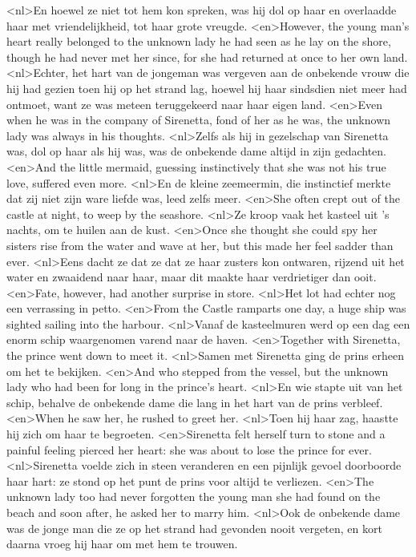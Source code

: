 <nl>En hoewel ze niet tot hem kon spreken, was hij dol op haar en overlaadde haar met vriendelijkheid, tot haar grote vreugde.
<en>However, the young man’s heart really belonged to the unknown lady he had seen as he lay on the shore, though he had never met her since, for she had returned at once to her own land.
<nl>Echter, het hart van de jongeman was vergeven aan de onbekende vrouw die hij had gezien toen hij op het strand lag, hoewel hij haar sindsdien niet meer had ontmoet, want ze was meteen teruggekeerd naar haar eigen land.
<en>Even when he was in the company of Sirenetta, fond of her as he was, the unknown lady was always in his thoughts.
<nl>Zelfs als hij in gezelschap van Sirenetta was, dol op haar als hij was, was de onbekende dame altijd in zijn gedachten.
<en>And the little mermaid, guessing instinctively that she was not his true love, suffered even more.
<nl>En de kleine zeemeermin, die instinctief merkte dat zij niet zijn ware liefde was, leed zelfs meer.
<en>She often crept out of the castle at night, to weep by the seashore.
<nl>Ze kroop  vaak het kasteel uit 's nachts, om te huilen aan de kust.
<en>Once she thought she could spy her sisters rise from the water and wave at her, but this made her feel sadder than ever.
<nl>Eens dacht ze dat ze dat ze  haar zusters kon ontwaren, rijzend  uit het water en zwaaidend naar haar, maar dit maakte haar verdrietiger dan ooit.
<en>Fate, however, had another surprise in store.
<nl>Het lot had echter nog een verrassing in petto.
<en>From the Castle ramparts one day, a huge ship was sighted sailing into the harbour.
<nl>Vanaf de kasteelmuren  werd op een dag een enorm schip waargenomen varend naar de haven.
<en>Together with Sirenetta, the prince went down to meet it.
<nl>Samen met Sirenetta ging de prins erheen om het te bekijken.
<en>And who stepped from the vessel, but the unknown lady who had been for long in the prince’s heart.
<nl>En wie stapte uit van het schip, behalve de onbekende dame die lang in het hart van de prins verbleef.
<en>When he saw her, he rushed to greet her.
<nl>Toen hij haar zag, haastte hij zich om haar te begroeten.
<en>Sirenetta felt herself turn to stone and a painful feeling pierced her heart: she was about to lose the prince for ever.
<nl>Sirenetta voelde  zich in steen veranderen en een pijnlijk gevoel doorboorde haar hart: ze stond op het punt de prins voor altijd te verliezen.
<en>The unknown lady too had never forgotten the young man she had found on the beach and soon after, he asked her to marry him.
<nl>Ook de onbekende dame was de jonge man die ze op het strand had gevonden nooit vergeten, en kort daarna vroeg hij haar om met hem te trouwen.
